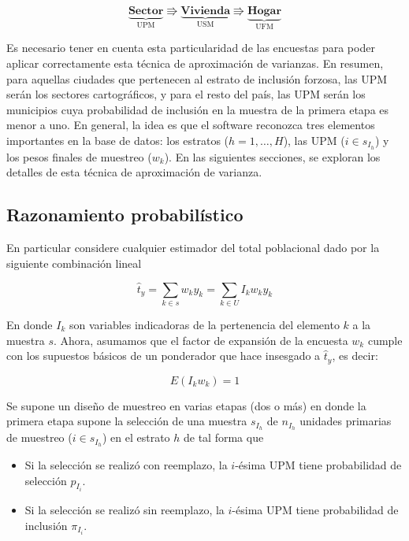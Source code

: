 \documentclass[12pt,spanish,]{book}
\providecommand{\tightlist}{%
  \setlength{\itemsep}{0pt}\setlength{\parskip}{0pt}}
\begin{document}
\begin{equation*}
\underbrace{\textbf{Sector}}_{\text{UPM}} \Rrightarrow
\underbrace{\textbf{Vivienda}}_{\text{USM}} \Rrightarrow
\underbrace{\textbf{Hogar}}_{\text{UFM}}
\end{equation*}

Es necesario tener en cuenta esta particularidad de las encuestas para poder aplicar correctamente esta técnica de aproximación de varianzas. En resumen, para aquellas ciudades que pertenecen al estrato de inclusión forzosa, las UPM serán los sectores cartográficos, y para el resto del país, las UPM serán los municipios cuya probabilidad de inclusión en la muestra de la primera etapa es menor a uno. En general, la idea es que el software reconozca tres elementos importantes en la base de datos: los estratos (\(h=1,\ldots, H\)), las UPM (\(i \in s_{I_h}\)) y los pesos finales de muestreo (\(w_k\)). En las siguientes secciones, se exploran los detalles de esta técnica de aproximación de varianza.

\hypertarget{razonamiento-probabilistico}{%
\subsection{Razonamiento probabilístico}\label{razonamiento-probabilistico}}

En particular considere cualquier estimador del total poblacional dado por la siguiente combinación lineal

\begin{equation}
\label{est}
\hat{t}_{y}=\sum_{k\in s} w_k y_k = \sum_{k\in U} I_k w_k y_k 
\end{equation}

En donde \(I_k\) son variables indicadoras de la pertenencia del elemento \(k\) a la muestra \(s\). Ahora, asumamos que el factor de expansión de la encuesta \(w_k\) cumple con los supuestos básicos de un ponderador que hace insesgado a \(\hat{t}_{y}\), es decir:

\begin{equation*}
E(I_k w_k) = 1
\end{equation*}

Se supone un diseño de muestreo en varias etapas (dos o más) en donde la primera etapa supone la selección de una muestra \(s_{I_h}\) de \(n_{I_h}\) unidades primarias de muestreo (\(i\in s_{I_h}\)) en el estrato \(h\) de tal forma que

\begin{itemize}
\tightlist
\item
  Si la selección se realizó con reemplazo, la \(i\)-ésima UPM tiene probabilidad de selección \(p_{I_i}\).
\item
  Si la selección se realizó sin reemplazo, la \(i\)-ésima UPM tiene probabilidad de inclusión \(\pi_{I_i}\).
\end{itemize}
\end{document}

